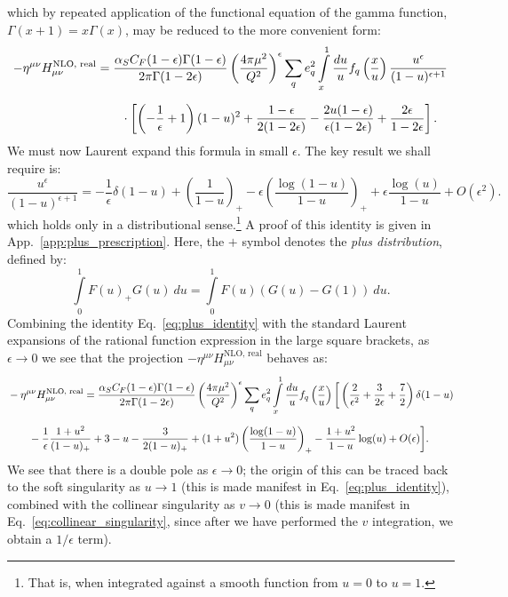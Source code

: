 \documentclass[withindex,glossary]{cam-thesis}
\begin{document}
which by repeated application of the functional equation of the gamma function, $\Gamma(x+1) = x\Gamma(x)$, may be reduced to the more convenient form:
\begin{align}
-\eta^{\mu\nu} H_{\mu\nu}^{\text{NLO, real}} &= \frac{\alpha_S C_F  (1-\epsilon) \Gamma(1-\epsilon)}{2\pi \Gamma(1 - 2\epsilon)} \left( \frac{4\pi \mu^2}{Q^2} \right)^{\epsilon} \sum_{q} e_q^2 \int\limits_{x}^{1} \frac{du}{u} f_q\left( \frac{x}{u} \right) \frac{u^{\epsilon}}{(1-u)^{\epsilon+1}} \notag\\[1.5ex]
&\qquad \cdot \left[ \left( -\frac{1}{\epsilon} + 1\right)(1-u)^2 +  \frac{1-\epsilon}{2(1-2\epsilon)} - \frac{2u(1-\epsilon)}{\epsilon(1-2\epsilon)} + \frac{2\epsilon}{1 - 2\epsilon} \right].
\label{eq:collinear_singularity}
\end{align}
We must now Laurent expand this formula in small $\epsilon$. The key result we shall require is:
\begin{equation}
\label{eq:plus_identity}
\frac{u^{\epsilon}}{(1-u)^{\epsilon+1}} = -\frac{1}{\epsilon} \delta(1-u) + \left( \frac{1}{1-u} \right)_+ - \epsilon \left( \frac{\log(1-u)}{1-u} \right)_+ + \epsilon \frac{\log(u)}{1-u} + O(\epsilon^2).
\end{equation}
which holds only in a distributional sense.\footnote{That is, when integrated against a smooth function from $u=0$ to $u=1$.} A proof of this identity is given in App.~\ref{app:plus_prescription}. Here, the $+$ symbol denotes the \textit{plus distribution}, defined by:
\begin{equation}
\int\limits_{0}^{1} F(u)_+ G(u)\ du = \int\limits_{0}^{1} F(u)(G(u) - G(1))\ du.
\end{equation}
Combining the identity Eq.~\eqref{eq:plus_identity} with the standard Laurent expansions of the rational function expression in the large square brackets, as $\epsilon \rightarrow 0$ we see that the projection $-\eta^{\mu\nu} H_{\mu\nu}^{\text{NLO, real}}$ behaves as:
\begin{align}
&-\eta^{\mu\nu} H_{\mu\nu}^{\text{NLO, real}} = \frac{\alpha_S C_F  (1-\epsilon) \Gamma(1-\epsilon)}{2\pi \Gamma(1 - 2\epsilon)} \left( \frac{4\pi \mu^2}{Q^2} \right)^{\epsilon} \sum_{q} e_q^2 \int\limits_{x}^{1} \frac{du}{u} f_q\left( \frac{x}{u} \right) \bigg[ \left( \frac{2}{\epsilon^2} + \frac{3}{2\epsilon} + \frac{7}{2} \right) \delta(1-u) \notag\\[1.5ex]
&\qquad- \frac{1}{\epsilon} \frac{1 + u^2}{(1-u)_+} + 3 - u - \frac{3}{2(1-u)_+} + (1+u^2) \left( \frac{\log(1-u)}{1-u} \right)_+ - \frac{1+u^2}{1-u} \log(u) + O(\epsilon)\bigg].
\end{align}
We see that there is a double pole as $\epsilon \rightarrow 0$; the origin of this can be traced back to the soft singularity as $u\rightarrow 1$ (this is made manifest in Eq.~\eqref{eq:plus_identity}), combined with the collinear singularity as $v \rightarrow 0$ (this is made manifest in Eq.~\eqref{eq:collinear_singularity}, since after we have performed the $v$ integration, we obtain a $1/\epsilon$ term).\\
\end{document}
